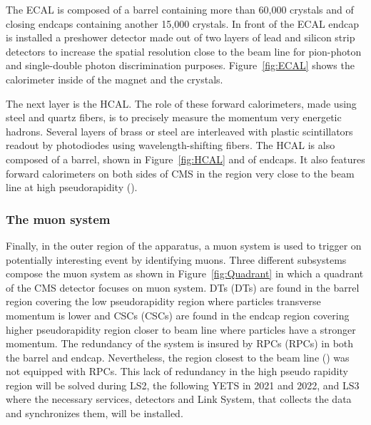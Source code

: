 	The ECAL is composed of a barrel containing more than 60,000 crystals and of closing endcaps containing another 15,000 crystals. In front of the ECAL endcap is installed a preshower detector made out of two layers of lead and silicon strip detectors to increase the spatial resolution close to the beam line for pion-photon and single-double photon discrimination purposes. Figure~\ref{fig:ECAL} shows the calorimeter inside of the magnet and the crystals.
	
	The next layer is the HCAL. The role of these forward calorimeters, made using steel and quartz fibers, is to precisely measure the momentum very energetic hadrons. Several layers of brass or steel are interleaved with plastic scintillators readout by photodiodes using wavelength-shifting fibers. The HCAL is also composed of a barrel, shown in Figure~\ref{fig:HCAL} and of endcaps. It also features forward calorimeters on both sides of CMS in the region very close to the beam line at high pseudorapidity ().
	
\endgroup
	
		\subsubsection{The muon system}
		\label{chapt2:sssec:muon}
	
	Finally, in the outer region of the apparatus, a muon system is used to trigger on potentially interesting event by identifying muons. Three different subsystems compose the muon system as shown in Figure~\ref{fig:Quadrant} in which a quadrant of the CMS detector focuses on muon system. \acl{DT}s (DTs) are found in the barrel region covering the low pseudorapidity region where particles transverse momentum is lower and \acl{CSC}s (CSCs) are found in the endcap region covering higher pseudorapidity region closer to beam line where particles have a stronger momentum. The redundancy of the system is insured by \acl{RPC}s (RPCs) in both the barrel and endcap. Nevertheless, the region closest to the beam line () was not equipped with RPCs. This lack of redundancy in the high pseudo rapidity region will be solved during LS2, the following \acf{YETS} in 2021 and 2022, and LS3 where the necessary services, detectors and Link System, that collects the data and synchronizes them, will be installed.

